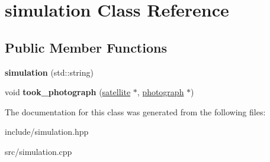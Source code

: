 \hypertarget{classsimulation}{}\section{simulation Class Reference}
\label{classsimulation}
\subsection*{Public Member Functions}
\begin{DoxyCompactItemize}
\item 
{\bfseries simulation} (std\+::string)\hypertarget{classsimulation_a6f65476e2eca401007e5e4a8b6e7610b}{}\label{classsimulation_a6f65476e2eca401007e5e4a8b6e7610b}

\item 
void {\bfseries took\+\_\+photograph} (\hyperlink{classsatellite}{satellite} $\ast$, \hyperlink{classphotograph}{photograph} $\ast$)\hypertarget{classsimulation_a93ee51e741fd9274edb2a69735c08271}{}\label{classsimulation_a93ee51e741fd9274edb2a69735c08271}

\end{DoxyCompactItemize}


The documentation for this class was generated from the following files\+:\begin{DoxyCompactItemize}
\item 
include/simulation.\+hpp\item 
src/simulation.\+cpp\end{DoxyCompactItemize}
